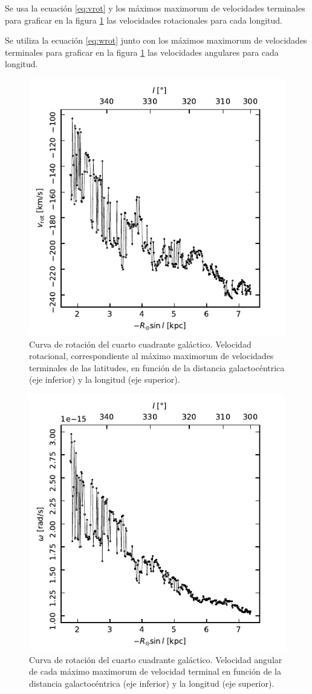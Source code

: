 Se usa la ecuación \ref{eq:vrot} y los máximos maximorum de velocidades terminales para graficar en la figura \ref{fig:vrot} las velocidades rotacionales para cada longitud.

Se utiliza la ecuación \ref{eq:wrot} junto con los máximos maximorum de velocidades terminales para graficar en la figura \ref{fig:vrot} las velocidades angulares para cada longitud.

\begin{figure}[htbp]
	\includegraphics{rsc/vrot.pdf}
	\caption{Curva de rotación del cuarto cuadrante galáctico. Velocidad rotacional, correspondiente al máximo maximorum de velocidades terminales de las latitudes, en función de la distancia galactocéntrica (eje inferior) y la longitud (eje superior).}
	\label{fig:vrot}
\end{figure}

\begin{figure}[htbp]
	\includegraphics{rsc/w.pdf}
	\caption{Curva de rotación del cuarto cuadrante galáctico. Velocidad angular de cada máximo maximorum de velocidad terminal en función de la distancia galactocéntrica (eje inferior) y la longitud (eje superior).}
	\label{fig:w}
\end{figure}
